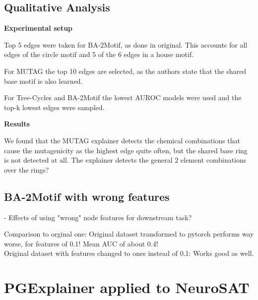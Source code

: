 \subsection{Qualitative Analysis}

\textbf{Experimental setup}

Top 5 edges were taken for BA-2Motif, as done in original. This accounts for all edges of the circle motif and 5 of the 6 edges in a house motif.

For MUTAG the top 10 edges are selected, as the authors state that the shared base motif is also learned.

For Tree-Cycles and BA-2Motif the lowest AUROC models were used and the top-k lowest edges were sampled.

\textbf{Results}

We found that the MUTAG explainer detects the chemical combinations that cause the mutagenicity as the highest edge quite often, but the shared base ring is not detected at all. The explainer detects the general 2 element combinations over the rings?





\subsection{BA-2Motif with wrong features}
- Effects of using "wrong" node features for downstream task?

Comparison to orginal one: Original dataset transformed to pytorch performs way worse, for features of 0.1! Mean AUC of about 0.4! \\
Original dataset with features changed to ones instead of 0.1: Works good as well.



\section{PGExplainer applied to NeuroSAT}
\label{sec:SAT-experiments}


